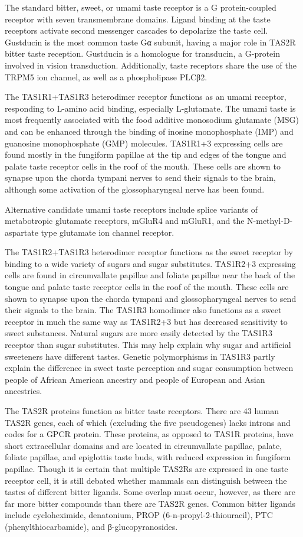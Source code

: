 \documentclass[]{book}
\begin{document}
The standard bitter, sweet, or umami taste receptor is a G protein-coupled receptor with seven transmembrane domains. Ligand binding at the taste receptors activate second messenger cascades to depolarize the taste cell. Gustducin is the most common taste Gα subunit, having a major role in TAS2R bitter taste reception. Gustducin is a homologue for transducin, a G-protein involved in vision transduction. Additionally, taste receptors share the use of the TRPM5 ion channel, as well as a phospholipase PLCβ2.

The TAS1R1+TAS1R3 heterodimer receptor functions as an umami receptor, responding to L-amino acid binding, especially L-glutamate. The umami taste is most frequently associated with the food additive monosodium glutamate (MSG) and can be enhanced through the binding of inosine monophosphate (IMP) and guanosine monophosphate (GMP) molecules. TAS1R1+3 expressing cells are found mostly in the fungiform papillae at the tip and edges of the tongue and palate taste receptor cells in the roof of the mouth. These cells are shown to synapse upon the chorda tympani nerves to send their signals to the brain, although some activation of the glossopharyngeal nerve has been found.

Alternative candidate umami taste receptors include splice variants of metabotropic glutamate receptors, mGluR4 and mGluR1, and the N-methyl-D-aspartate type glutamate ion channel receptor.

The TAS1R2+TAS1R3 heterodimer receptor functions as the sweet receptor by binding to a wide variety of sugars and sugar substitutes. TAS1R2+3 expressing cells are found in circumvallate papillae and foliate papillae near the back of the tongue and palate taste receptor cells in the roof of the mouth. These cells are shown to synapse upon the chorda tympani and glossopharyngeal nerves to send their signals to the brain. The TAS1R3 homodimer also functions as a sweet receptor in much the same way as TAS1R2+3 but has decreased sensitivity to sweet substances. Natural sugars are more easily detected by the TAS1R3 receptor than sugar substitutes. This may help explain why sugar and artificial sweeteners have different tastes. Genetic polymorphisms in TAS1R3 partly explain the difference in sweet taste perception and sugar consumption between people of African American ancestry and people of European and Asian ancestries.

The TAS2R proteins function as bitter taste receptors. There are 43 human TAS2R genes, each of which (excluding the five pseudogenes) lacks introns and codes for a GPCR protein. These proteins, as opposed to TAS1R proteins, have short extracellular domains and are located in circumvallate papillae, palate, foliate papillae, and epiglottis taste buds, with reduced expression in fungiform papillae. Though it is certain that multiple TAS2Rs are expressed in one taste receptor cell, it is still debated whether mammals can distinguish between the tastes of different bitter ligands. Some overlap must occur, however, as there are far more bitter compounds than there are TAS2R genes. Common bitter ligands include cycloheximide, denatonium, PROP (6-n-propyl-2-thiouracil), PTC (phenylthiocarbamide), and β-glucopyranosides.
\end{document}
